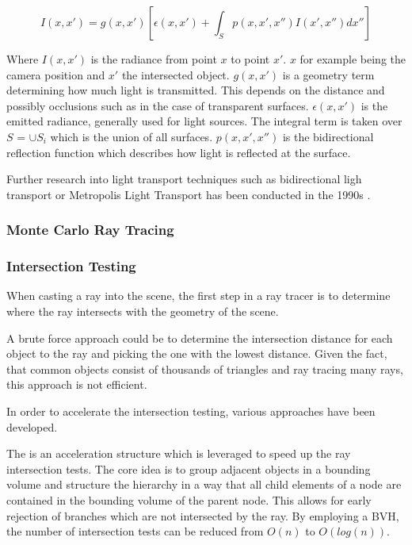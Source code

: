 \begin{equation}
  \label{eqn:rendering-equation}
  I(x, x') = g(x, x') [\epsilon(x, x') + \int_{S} p(x, x', x'')I(x', x'')dx'']
\end{equation}

Where $I(x, x')$ is the radiance from point $x$ to point $x'$. $x$ for example being the camera position and $x'$ the intersected object. $g(x, x')$ is a geometry term determining how much light is transmitted. This depends on the distance and possibly occlusions such as in the case of transparent surfaces. $\epsilon(x, x')$ is the emitted radiance, generally used for light sources. The integral term is taken over $S$ = $\cup S_i$ which is the union of all surfaces. $p(x, x', x'')$ is the bidirectional reflection function which describes how light is reflected at the surface. \cite{kajiya1986rendering}

Further research into light transport techniques such as bidirectional ligh transport or Metropolis Light Transport has been conducted in the 1990s \cite{veachMonteCarloLightTransport}.


\subsubsection{Monte Carlo Ray Tracing}
\subsubsection{Intersection Testing}

When casting a ray into the scene, the first step in a ray tracer is to determine where the ray intersects with the geometry of the scene.

A brute force approach could be to determine the intersection distance for each object to the ray and picking the one with the lowest distance. Given the fact, that common objects consist of thousands of triangles and ray tracing many rays, this approach is not efficient.

In order to accelerate the intersection testing, various approaches have been developed.

The  is an acceleration structure which is leveraged to speed up the ray intersection tests. The core idea is to group adjacent objects in a bounding volume and structure the hierarchy in a way that all child elements of a node are contained in the bounding volume of the parent node. This allows for early rejection of branches which are not intersected by the ray. By employing a BVH, the number of intersection tests can be reduced from $O(n)$ to $O(log(n))$.

